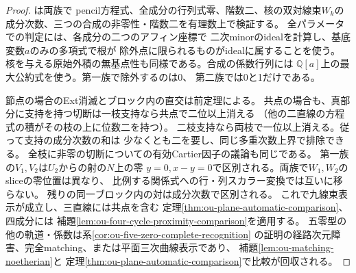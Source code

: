 \begin{proof}
は両族で
pencil方程式、全成分の行列式零、階数二、核の双対線束$W_k$の
成分次数、三つの合成の非零性・階数二を有理数上で検証する。
全パラメータでの判定には、各成分の二つのアフィン座標で
二次minorのidealを計算し、基底変数$a$のみの多項式で根が
除外点に限られるものがidealに属することを使う。
核を与える原始外積の無基点性も同様である。合成の係数行列には
$\mathbb Q[a]$上の最大公約式を使う。第一族で除外するのは0、
第二族では0と1だけである。

節点の場合のExt消滅とブロック内の直交は前定理による。
共点の場合も、真部分に支持を持つ切断は一枝支持なら共点で二位以上消える
（他の二直線の方程式の積がその枝の上に位数二を持つ）。
二枝支持なら両枝で一位以上消える。従って支持の成分次数の和は
少なくとも二を要し、同じ多重次数上界で排除できる。
全枝に非零の切断についての有効Cartier因子の議論も同じである。
第一族の$V_1,V_2$は$U_2$からの射の$N$上の零
$y=0,x-y=0$で区別される。両族で$W_1,W_2$のsliceの零位置は異なり、
比例する関係式への行・列スカラー変換では互いに移らない。
残りの同一ブロック内の対は成分次数で区別される。
これで九線束表示が成立し、三直線には共点を含む
定理\ref{thm:ou-plane-automatic-comparison}、四成分には
補題\ref{lem:ou-four-cycle-proximity-comparison}を適用する。
五零型の他の軌道・係数は系\ref{cor:ou-five-zero-complete-recognition}
の証明の経路次元障害、完全matching、または平面三次曲線表示であり、
補題\ref{lem:ou-matching-noetherian}と
定理\ref{thm:ou-plane-automatic-comparison}で比較が回収される。
\end{proof}

